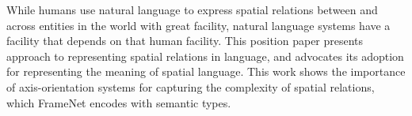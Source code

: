While humans use natural language to express spatial relations between and across entities in the world with great facility, natural language systems have a facility that depends on that human facility. This position paper presents approach to representing spatial relations in language, and advocates its adoption for representing the meaning of spatial language. This work shows the importance of axis-orientation systems for capturing the complexity of spatial relations, which FrameNet encodes with semantic types.
